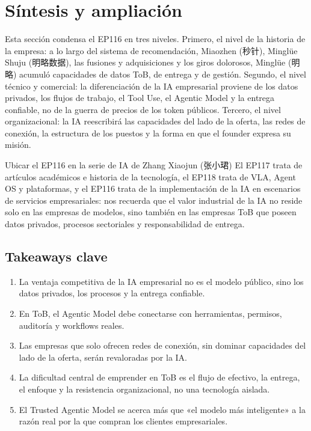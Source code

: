 \section{Síntesis y ampliación}

Esta sección condensa el EP116 en tres niveles. Primero, el nivel de la historia de la empresa: a lo largo del sistema de recomendación, Miaozhen (秒针), Minglüe Shuju (明略数据), las fusiones y adquisiciones y los giros dolorosos, Minglüe (明略) acumuló capacidades de datos ToB, de entrega y de gestión. Segundo, el nivel técnico y comercial: la diferenciación de la IA empresarial proviene de los datos privados, los flujos de trabajo, el Tool Use, el Agentic Model y la entrega confiable, no de la guerra de precios de los token públicos. Tercero, el nivel organizacional: la IA reescribirá las capacidades del lado de la oferta, las redes de conexión, la estructura de los puestos y la forma en que el founder expresa su misión.

\begin{importantbox}{Ubicar el EP116 en la serie de IA de Zhang Xiaojun (张小珺)}
El EP117 trata de artículos académicos e historia de la tecnología, el EP118 trata de VLA, Agent OS y plataformas, y el EP116 trata de la implementación de la IA en escenarios de servicios empresariales: nos recuerda que el valor industrial de la IA no reside solo en las empresas de modelos, sino también en las empresas ToB que poseen datos privados, procesos sectoriales y responsabilidad de entrega.
\end{importantbox}

\subsection{Takeaways clave}

\begin{enumerate}
\item La ventaja competitiva de la IA empresarial no es el modelo público, sino los datos privados, los procesos y la entrega confiable.
\item En ToB, el Agentic Model debe conectarse con herramientas, permisos, auditoría y workflows reales.
\item Las empresas que solo ofrecen redes de conexión, sin dominar capacidades del lado de la oferta, serán revaloradas por la IA.
\item La dificultad central de emprender en ToB es el flujo de efectivo, la entrega, el enfoque y la resistencia organizacional, no una tecnología aislada.
\item El Trusted Agentic Model se acerca más que «el modelo más inteligente» a la razón real por la que compran los clientes empresariales.
\end{enumerate}

